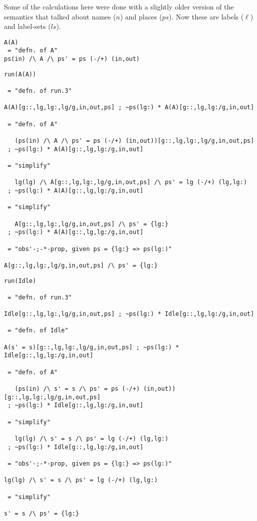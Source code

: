 \label{ha:sem-calcs}

Some of the calculations here were done with a slightly older version
of the semantics that talked about names ($n$) and places ($ps$).
Now these are labels ($\ell$) and label-sets ($ls$).


\begin{verbatim}
A(A)
 = "defn. of A"
ps(in) /\ A /\ ps' = ps (-/+) (in,out)
\end{verbatim}

\begin{verbatim}
run(A(A))

 = "defn. of run.3"

A(A)[g::,lg,lg:,lg/g,in,out,ps] ; ~ps(lg:) * A(A)[g::,lg,lg:/g,in,out]

 = "defn. of A"

   (ps(in) /\ A /\ ps' = ps (-/+) (in,out))[g::,lg,lg:,lg/g,in,out,ps]
 ; ~ps(lg:) * A(A)[g::,lg,lg:/g,in,out]

 = "simplify"

   lg(lg) /\ A[g::,lg,lg:,lg/g,in,out,ps] /\ ps' = lg (-/+) (lg,lg:)
 ; ~ps(lg:) * A(A)[g::,lg,lg:/g,in,out]

 = "simplify"

   A[g::,lg,lg:,lg/g,in,out,ps] /\ ps' = {lg:}
 ; ~ps(lg:) * A(A)[g::,lg,lg:/g,in,out]

 = "obs'-;-*-prop, given ps = {lg:} => ps(lg:)"

A[g::,lg,lg:,lg/g,in,out,ps] /\ ps' = {lg:}
\end{verbatim}

\begin{verbatim}
run(Idle)

 = "defn. of run.3"

Idle[g::,lg,lg:,lg/g,in,out,ps] ; ~ps(lg:) * Idle[g::,lg,lg:/g,in,out]

 = "defn. of Idle"

A(s' = s)[g::,lg,lg:,lg/g,in,out,ps] ; ~ps(lg:) * Idle[g::,lg,lg:/g,in,out]

 = "defn. of A"

   (ps(in) /\ s' = s /\ ps' = ps (-/+) (in,out))[g::,lg,lg:,lg/g,in,out,ps]
 ; ~ps(lg:) * Idle[g::,lg,lg:/g,in,out]

 = "simplify"

   lg(lg) /\ s' = s /\ ps' = lg (-/+) (lg,lg:)
 ; ~ps(lg:) * Idle[g::,lg,lg:/g,in,out]

 = "obs'-;-*-prop, given ps = {lg:} => ps(lg:)"

lg(lg) /\ s' = s /\ ps' = lg (-/+) (lg,lg:)

 = "simplify"

s' = s /\ ps' = {lg:}
\end{verbatim}

